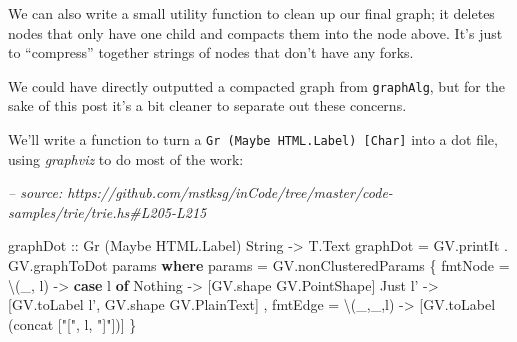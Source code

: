 \documentclass[]{article}
\newenvironment{Shaded}{}{}
\newcommand{\CommentTok}[1]{\textcolor[rgb]{0.38,0.63,0.69}{\textit{#1}}}
\newcommand{\DataTypeTok}[1]{\textcolor[rgb]{0.56,0.13,0.00}{#1}}
\newcommand{\FunctionTok}[1]{\textcolor[rgb]{0.02,0.16,0.49}{#1}}
\newcommand{\KeywordTok}[1]{\textcolor[rgb]{0.00,0.44,0.13}{\textbf{#1}}}
\newcommand{\NormalTok}[1]{#1}
\newcommand{\OtherTok}[1]{\textcolor[rgb]{0.00,0.44,0.13}{#1}}
\newcommand{\StringTok}[1]{\textcolor[rgb]{0.25,0.44,0.63}{#1}}
\begin{document}
We can also write a small utility function to clean up our final graph; it
deletes nodes that only have one child and compacts them into the node above.
It's just to ``compress'' together strings of nodes that don't have any forks.

\begin{Shaded}
\end{Shaded}

We could have directly outputted a compacted graph from \texttt{graphAlg}, but
for the sake of this post it's a bit cleaner to separate out these concerns.

We'll write a function to turn a \texttt{Gr\ (Maybe\ HTML.Label)\ {[}Char{]}}
into a dot file, using \emph{graphviz} to do most of the work:

\begin{Shaded}
\begin{Highlighting}[]
\CommentTok{-- source: https://github.com/mstksg/inCode/tree/master/code-samples/trie/trie.hs#L205-L215}

\NormalTok{graphDot}
\OtherTok{    ::} \DataTypeTok{Gr}\NormalTok{ (}\DataTypeTok{Maybe} \DataTypeTok{HTML.Label}\NormalTok{) }\DataTypeTok{String}
    \OtherTok{->} \DataTypeTok{T.Text}
\NormalTok{graphDot }\FunctionTok{=}\NormalTok{ GV.printIt }\FunctionTok{.}\NormalTok{ GV.graphToDot params}
  \KeywordTok{where}
\NormalTok{    params }\FunctionTok{=}\NormalTok{ GV.nonClusteredParams}
\NormalTok{      \{ fmtNode }\FunctionTok{=}\NormalTok{ \textbackslash{}(_,  l) }\OtherTok{->} \KeywordTok{case}\NormalTok{ l }\KeywordTok{of}
          \DataTypeTok{Nothing} \OtherTok{->}\NormalTok{ [GV.shape }\DataTypeTok{GV.PointShape}\NormalTok{]}
          \DataTypeTok{Just}\NormalTok{ l' }\OtherTok{->}\NormalTok{ [GV.toLabel l', GV.shape }\DataTypeTok{GV.PlainText}\NormalTok{]}
\NormalTok{      , fmtEdge }\FunctionTok{=}\NormalTok{ \textbackslash{}(_,_,l) }\OtherTok{->}\NormalTok{ [GV.toLabel (concat [}\StringTok{"["}\NormalTok{, l, }\StringTok{"]"}\NormalTok{])]}
\NormalTok{      \}}
\end{Highlighting}
\end{Shaded}
\end{document}
